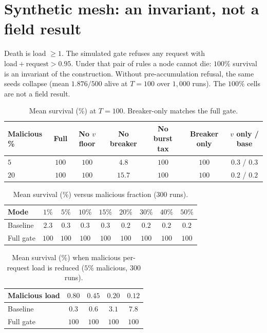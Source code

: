 \documentclass[11pt,a4paper]{article}
\begin{document}
\section{Synthetic mesh: an invariant, not a field result}
\label{app:mesh}

Death is load $\ge 1$.
The simulated gate refuses any request with $\mathrm{load}+\mathrm{request}>0.95$.
Under that pair of rules a node cannot die: $100\%$ survival is an invariant of the construction.
Without pre-accumulation refusal, the same seeds collapse (mean $1.876/500$ alive at $T=100$ over $1{,}000$ runs).
The $100\%$ cells are not a field result.

\begin{table}[htbp]
\centering
\caption{Mean survival (\%) at $T=100$. Breaker-only matches the full gate.}
\label{tab:ablate}
\small
\begin{tabular}{@{}lcccccc@{}}
\toprule
Malicious \% & Full & No $v$ floor & No breaker & No burst tax & Breaker only & $v$ only / base \\
\midrule
$5$  & $100$ & $100$ & $4.8$  & $100$ & $100$ & $0.3$ / $0.3$ \\
$20$ & $100$ & $100$ & $15.7$ & $100$ & $100$ & $0.2$ / $0.2$ \\
\bottomrule
\end{tabular}
\end{table}

\begin{table}[htbp]
\centering
\caption{Mean survival (\%) versus malicious fraction ($300$ runs).}
\label{tab:rate}
\small
\begin{tabular}{@{}lcccccccc@{}}
\toprule
Mode & $1\%$ & $5\%$ & $10\%$ & $15\%$ & $20\%$ & $30\%$ & $40\%$ & $50\%$ \\
\midrule
Baseline & $2.3$ & $0.3$ & $0.3$ & $0.3$ & $0.2$ & $0.2$ & $0.2$ & $0.2$ \\
Full gate & $100$ & $100$ & $100$ & $100$ & $100$ & $100$ & $100$ & $100$ \\
\bottomrule
\end{tabular}
\end{table}

\begin{table}[htbp]
\centering
\caption{Mean survival (\%) when malicious per-request load is reduced ($5\%$ malicious, $300$ runs).}
\label{tab:adapt}
\small
\begin{tabular}{@{}lcccc@{}}
\toprule
Malicious load & $0.80$ & $0.45$ & $0.20$ & $0.12$ \\
\midrule
Baseline & $0.3$ & $0.6$ & $3.1$ & $7.8$ \\
Full gate & $100$ & $100$ & $100$ & $100$ \\
\bottomrule
\end{tabular}
\end{table}
\end{document}
